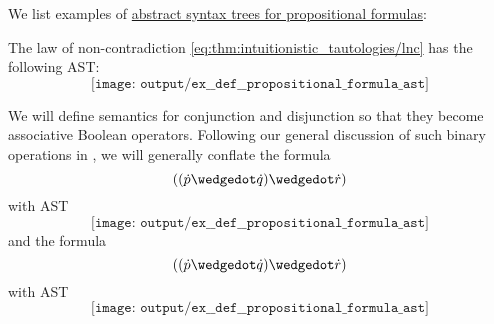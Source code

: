 \begin{example}\label{ex:def:propositional_formula_ast}
  We list examples of \hyperref[def:propositional_formula_ast]{abstract syntax trees for propositional formulas}:
  \begin{thmenum}
     The law of non-contradiction \eqref{eq:thm:intuitionistic_tautologies/lnc} has the following AST:
    \begin{equation*}
      \texttt{[image: output/ex\_\_def\_\_propositional\_formula\_ast]}
    \end{equation*}

     We will define semantics for conjunction and disjunction so that they become associative Boolean operators. Following our general discussion of such binary operations in , we will generally conflate the formula
    \begin{equation*}
      ((\synp \synwedge \synq) \synwedge \syn r)
    \end{equation*}
    with AST
    \begin{equation*}
      \texttt{[image: output/ex\_\_def\_\_propositional\_formula\_ast]}
    \end{equation*}
    and the formula
    \begin{equation*}
      ((\synp \synwedge \synq) \synwedge \syn r)
    \end{equation*}
    with AST
    \begin{equation*}
      \texttt{[image: output/ex\_\_def\_\_propositional\_formula\_ast]}
    \end{equation*}
  \end{thmenum}
\end{example}

